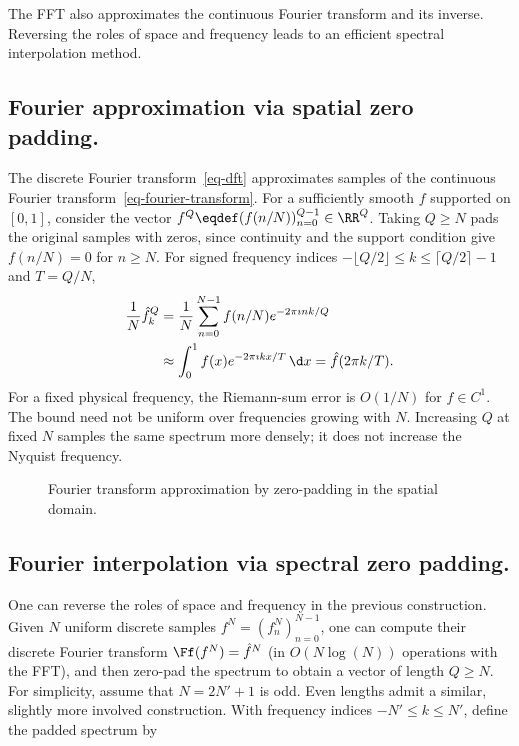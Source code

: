 The FFT also approximates the continuous Fourier transform and its inverse. Reversing the roles of space and frequency leads to an efficient spectral interpolation method.


\subsection{Fourier approximation via spatial zero padding.}

The discrete Fourier transform~\eqref{eq-dft} approximates samples of the continuous Fourier transform~\eqref{eq-fourier-transform}. For a sufficiently smooth $f$ supported on $[0,1]$, consider the vector $f^Q \eqdef (f(n/N))_{n=0}^{Q-1} \in \RR^Q$. Taking $Q\geq N$ pads the original samples with zeros, since continuity and the support condition give $f(n/N)=0$ for $n\geq N$.
For signed frequency indices $-\lfloor Q/2\rfloor\leq k\leq\lceil Q/2\rceil-1$ and $T=Q/N$,
\begin{align*}
 \frac1N\hat f_k^Q
 &=\frac1N\sum_{n=0}^{N-1}f(n/N)e^{-2\pi\imath nk/Q}\\
 &\approx\int_0^1f(x)e^{-2\pi\imath kx/T}\,\d x
 =\hat f(2\pi k/T).
\end{align*}
For a fixed physical frequency, the Riemann-sum error is $O(1/N)$ for $f\in C^1$. The bound need not be uniform over frequencies growing with $N$. Increasing $Q$ at fixed $N$ samples the same spectrum more densely; it does not increase the Nyquist frequency.

\begin{figure}[tbp]
\centering
{}
\caption{Fourier transform approximation by zero-padding in the spatial domain.}
\label{fig-padding-spacial}
\end{figure}


\subsection{Fourier interpolation via spectral zero padding.}

One can reverse the roles of space and frequency in the previous construction. 
%
Given $N$ uniform discrete samples $f^N=(f^N_n)_{n=0}^{N-1}$, one can compute their discrete Fourier transform $\Ff(f^N) = \hat f^N$ (in $O(N \log(N))$ operations with the FFT),
and then zero-pad the spectrum to obtain a vector of length $Q\geq N$.
%
For simplicity, assume that $N=2N'+1$ is odd. Even lengths admit a similar, slightly more involved construction.
%
With frequency indices $-N'\leq k\leq N'$, define the padded spectrum by

